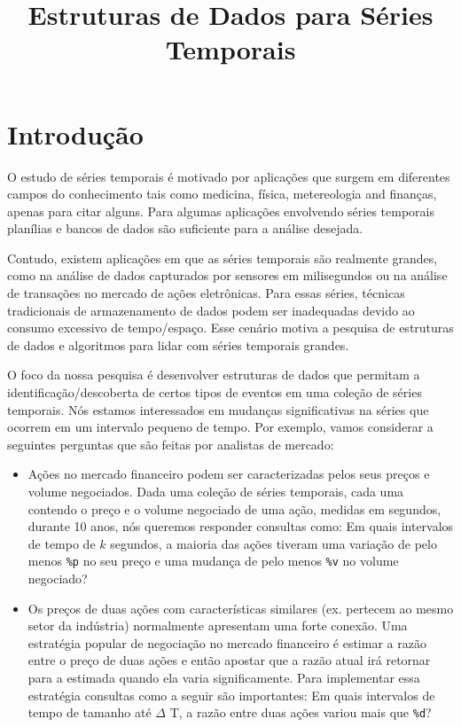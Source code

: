 \documentclass[12pt]{article}
\begin{document}
\nocite{*}

\title{Estruturas de Dados para Séries Temporais}

\maketitle

\section{Introdução}

O estudo de séries temporais é motivado por aplicações que surgem 
em diferentes campos do conhecimento tais como medicina, física, metereologia
and finanças, apenas para citar alguns. Para algumas aplicações envolvendo
séries temporais planílias e bancos de dados são suficiente para a análise
desejada. 

Contudo, existem aplicações em que as séries temporais são realmente grandes,
como na análise de dados capturados por sensores em milisegundos ou na
análise de transações no mercado de ações eletrônicas. Para essas
séries, técnicas tradicionais de armazenamento de dados podem ser inadequadas
devido ao consumo excessivo de tempo/espaço. Esse cenário motiva a pesquisa de 
estruturas de dados e algoritmos para lidar com séries temporais grandes\cite{lala}.

O foco da nossa pesquisa é desenvolver estruturas de dados que permitam
a identificação/descoberta de certos tipos de eventos em uma coleção
de séries temporais. Nós estamos interessados em mudanças significativas
na séries que ocorrem em um intervalo pequeno de tempo. Por exemplo,
vamos considerar a seguintes perguntas que são feitas por analistas
de mercado:

\begin{itemize}
\item Ações no mercado financeiro podem ser caracterizadas pelos seus
preços e volume negociados. Dada uma coleção de séries temporais, cada
uma contendo o preço e o volume negociado de uma ação, medidas em segundos,
durante 10 anos, nós queremos responder consultas como: Em quais intervalos
de tempo de $k$ segundos, a maioria das ações tiveram uma variação de pelo
menos {\tt \%p} no seu preço e uma mudança de pelo menos {\tt \%v} no volume
negociado?

\item Os preços de duas ações com características similares (ex. pertecem
ao mesmo setor da indústria) normalmente apresentam uma forte conexão.
 Uma estratégia popular de negociação no mercado financeiro é estimar a razão
entre o preço de duas ações e então apostar que a razão atual irá
retornar para a estimada quando ela varia significamente. Para implementar
essa estratégia consultas como a seguir são importantes: Em quais intervalos
de tempo de tamanho até $\Delta$ T, a razão entre duas ações variou mais que
{\tt \%d}?

\end{itemize}
\end{document}
